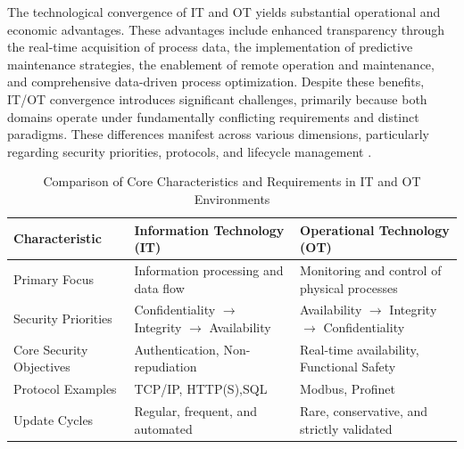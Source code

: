 The technological convergence of IT and OT yields substantial operational and economic advantages. These advantages include enhanced transparency through the real-time acquisition of process data, the implementation of predictive maintenance strategies, the enablement of remote operation and maintenance, and comprehensive data-driven process optimization. Despite these benefits, IT/OT convergence introduces significant challenges, primarily because both domains operate under fundamentally conflicting requirements and distinct paradigms. These differences manifest across various dimensions, particularly regarding security priorities, protocols, and lifecycle management \cite{hwi_ot_definition}.

\begin{table}[htbp]
	\caption{Comparison of Core Characteristics and Requirements in IT and OT Environments \cite[p. 1]{8586807} \cite{hwi_ot_definition}}
	\label{tab:it_ot_comparison}
	\centering
	\begin{tabularx}{\textwidth}{l X X}
		\toprule  
		\textbf{Characteristic} & \textbf{Information Technology (IT)} & \textbf{Operational Technology (OT)} \\ 
		\midrule
		Primary Focus & Information processing and data flow & Monitoring and control of physical processes \\ \addlinespace
		Security Priorities & Confidentiality $\rightarrow$ \newline Integrity $\rightarrow$ \newline Availability & Availability $\rightarrow$ \newline Integrity $\rightarrow$ \newline Confidentiality \\ \addlinespace
		Core Security Objectives & Authentication, \newline Non-repudiation & Real-time availability, \newline Functional Safety \\ \addlinespace
		Protocol Examples & TCP/IP, \newline HTTP(S),\newline SQL & Modbus, \newline Profinet \\ \addlinespace
		Update Cycles & Regular, frequent, and automated & Rare, conservative, and strictly validated \\ 
		\bottomrule  
	\end{tabularx}
\end{table}


